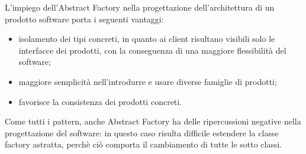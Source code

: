 L'impiego dell'Abstract Factory nella progettazione dell'architettura di un prodotto software porta i seguenti vantaggi:
\begin{itemize}
\item isolamento dei tipi concreti, in quanto ai client risultano visibili solo le interfacce dei prodotti, con la conseguenza di una maggiore flessibilità del software;
\item maggiore semplicità nell'introdurre e usare diverse famiglie di prodotti;
\item favorisce la consistenza dei prodotti concreti.
\end{itemize}
Come tutti i pattern, anche Abstract Factory ha delle ripercussioni negative nella progettazione del software: in questo caso risulta difficile estendere la classe factory astratta, perchè ciò comporta il cambiamento di tutte le sotto classi.
